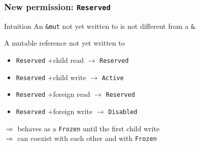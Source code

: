 \begin{frame}
    \frametitle{New permission: \texttt{Reserved}}
    \begin{exampleblock}{Intuition}
        An \texttt{\&mut} not yet written to is not different from a \texttt{\&}.
    \end{exampleblock}

    A mutable reference not yet written to
    \begin{itemize}
        \item \texttt{Reserved} +child read \(\to\) \texttt{Reserved}
        \item \texttt{Reserved} +child write \(\to\) \texttt{Active}
        \item \texttt{Reserved} +foreign read \(\to\) \texttt{Reserved}
        \item \texttt{Reserved} +foreign write \(\to\) \texttt{Disabled}
    \end{itemize}
    \(\Rightarrow\) behaves as a \texttt{Frozen} until the first child write\\
    \(\Rightarrow\) can coexist with each other and with \texttt{Frozen}~\\~\\
\end{frame}

